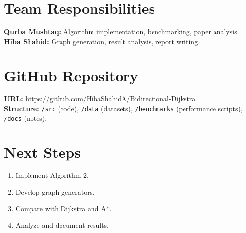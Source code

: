 \documentclass[10pt]{article}
\begin{document}
\section*{Team Responsibilities}
\textbf{Qurba Mushtaq:} Algorithm implementation, benchmarking, paper analysis.\\
\textbf{Hiba Shahid:} Graph generation, result analysis, report writing.

\section*{GitHub Repository}
\textbf{URL:} \url{https://github.com/HibaShahidA/Bidirectional-Dijkstra}\\
\textbf{Structure:} \texttt{/src} (code), \texttt{/data} (datasets), \texttt{/benchmarks} (performance scripts), \texttt{/docs} (notes).

\section*{Next Steps}
\begin{enumerate}
    \item Implement Algorithm 2.
    \item Develop graph generators.
    \item Compare with Dijkstra and A*.
    \item Analyze and document results.
\end{enumerate}
\end{document}
